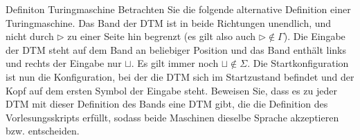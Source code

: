 \documentclass[answers]{submit}
\begin{document}
\begin{exercise}[6]{Definiton Turingmaschine}
  Betrachten Sie die folgende alternative Definition einer Turingmaschine.
  Das Band der DTM ist in beide Richtungen unendlich, und nicht durch $\rhd$ zu einer Seite hin begrenzt (es gilt also auch $\rhd\not\in\Gamma$).
  Die Eingabe der DTM steht auf dem Band an beliebiger Position und das Band enthält links und rechts der Eingabe nur $\sqcup$.
  Es gilt immer noch $\sqcup\not\in\Sigma$.
  Die Startkonfiguration ist nun die Konfiguration, bei der die DTM sich im Startzustand befindet und der Kopf auf dem ersten Symbol der Eingabe steht.
  Beweisen Sie, dass es zu jeder DTM mit dieser Definition des Bands eine DTM gibt, die die Definition des Vorlesungsskripts erfüllt, sodass beide Maschinen dieselbe Sprache akzeptieren bzw. entscheiden.

\end{exercise}
\end{document}
